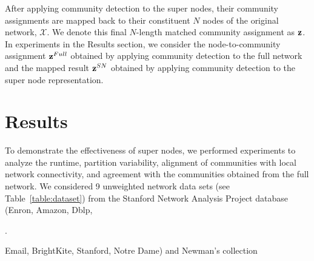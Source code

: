 After applying community detection to the super nodes, their community assignments are mapped back to their constituent $N$ nodes of the original network, ${\mathcal X}$. We denote this final $N$-length matched community assignment as ${\bf z}$. In experiments in the Results section, we consider the node-to-community assignment ${\bf z}^{Full}$ obtained by applying community detection to the full network and the mapped result ${\bf z}^{SN}$ obtained by applying community detection to the super node representation.

\section{Results}
To demonstrate the effectiveness of super nodes, we performed experiments to analyze the runtime, partition variability, alignment of communities with local network connectivity, and agreement with the communities obtained from the full network. We considered 9 unweighted network data sets (see Table~\ref{table:dataset})  from the Stanford Network Analysis Project database\cite{snapdata}
(Enron, Amazon, Dblp, 
\begin{table}.   %
\begin{center}
\end{center}
\caption{Network data characteristics.\label{table:dataset}}
\end{table}
Email, BrightKite, Stanford, Notre Dame) and Newman's collection\cite{newmandata}
